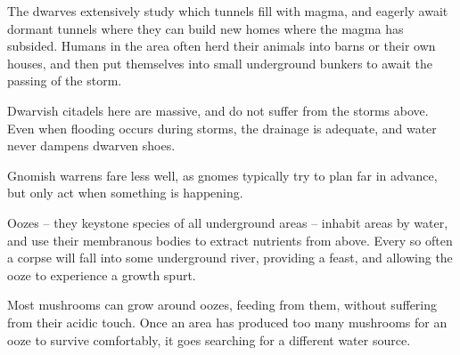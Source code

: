 \begin{multicols}{2}
The dwarves extensively study which tunnels fill with magma, and eagerly await dormant tunnels where they can build new homes where the magma has subsided.
Humans in the area often herd their animals into barns or their own houses, and then put themselves into small underground bunkers to await the passing of the storm.

Dwarvish citadels here are massive, and do not suffer from the storms above.
Even when flooding occurs during storms, the drainage is adequate, and water never dampens dwarven shoes.

Gnomish warrens fare less well, as gnomes typically try to plan far in advance, but only act when something is happening.

Oozes -- they keystone species of all underground areas -- inhabit areas by water, and use their membranous bodies to extract nutrients from above.
Every so often a corpse will fall into some underground river, providing a feast, and allowing the ooze to experience a growth spurt.

Most mushrooms can grow around oozes, feeding from them, without suffering from their acidic touch.
Once an area has produced too many mushrooms for an ooze to survive comfortably, it goes searching for a different water source.

\iftoggle{players}{
  \subsubsection{Character Concepts}
  \begin{itemize}

    \item
    A lovesick dwarf who could not win the heart of his princess.
    He intends to bring her a collection of monstrous heads to build a throne so high that her head will touch the ceiling in the feasting halls of the Shale.

    Of course her chief loves are logistics and gardening, but it's the thought that counts.
    \item
    A suspicious child (in fact a clean-shaven gnome), who never speaks about the true extent of his abilities, and joined the guard as an emissary of the Ale Guild with forged paperwork.
    \item
    Guard number 46.
    Just a random guy.
    `What? Nothing to see here'.

  \end{itemize}
}{
\subsubsection{Seasonal Encounters}

}
\end{multicols}

